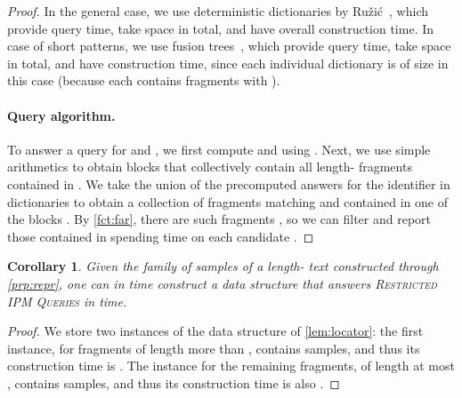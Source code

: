 \documentclass[a4paper]{article}
\newtheorem{corollary}[theorem]{Corollary}
\theoremstyle{definition}
\theoremstyle{remark}
\newcommand{\RIPM}{\textsc{Restricted IPM Queries}\xspace}
\begin{document}
\begin{proof}
In the general case, we use deterministic dictionaries by Ružić~\cite{DBLP:conf/icalp/Ruzic08},
which provide  query time, take  space in total, and have  
overall construction time.
In case of short patterns, we use fusion trees~\cite{DBLP:conf/focs/PatrascuT14},
which provide  query time, take  space in total, and have  construction time,
since each individual dictionary is of size  in this case (because each  contains  fragments  with ).

\paragraph{Query algorithm.}
To answer a query for  and , we first compute  and  using .
Next, we use simple arithmetics to obtain  blocks  
that collectively contain all length- fragments contained in .
We take the union of the precomputed answers for the identifier  in dictionaries  to obtain a collection of fragments  matching  and contained in one of the blocks .
By \cref{fct:far}, there are  such fragments , so we can filter and report those contained in  spending  time on each candidate .
\end{proof}

\begin{corollary}\label{cor:locator}
  Given the family  of samples of a length- text 
  constructed through \cref{prp:repr},
  one can in  time construct a data structure that answers \RIPM
  in  time.
\end{corollary}
\begin{proof}
We store two instances of the data structure of \cref{lem:locator}: the first instance,
for fragments of length more than , contains  samples,
and thus its construction time is .
The instance for the remaining fragments, of length at most , contains 
samples, and thus its construction time is also .
\end{proof}
\end{document}
